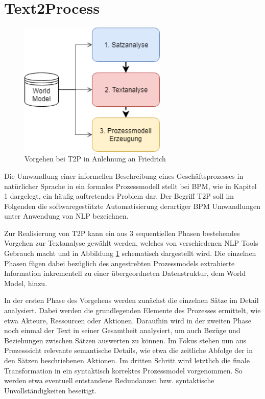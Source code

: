 \section{Text2Process}
\begin{figure}
\includegraphics[width=7cm]{pictures/T2P_highlevel.png}
\caption{Vorgehen bei T2P in Anlehnung an Friedrich}
\label{fig:T2PHL}
\end{figure}
Die Umwandlung einer informellen Beschreibung eines Geschäftsprozesses in natürlicher Sprache in ein formales Prozessmodell stellt bei \ac{BPM}, wie in Kapitel 1 dargelegt, ein häufig auftretendes Problem dar. 
Der Begriff \ac{T2P} soll im Folgenden die softwaregestützte Automatisierung derartiger \ac{BPM} Umwandlungen unter Anwendung von \ac{NLP} bezeichnen.\par
Zur Realisierung von \ac{T2P} kann ein aus 3 sequentiellen Phasen bestehendes Vorgehen zur Textanalyse gewählt werden, welches von verschiedenen \ac{NLP} Tools Gebrauch macht und in Abbildung \ref{fig:T2PHL} schematisch dargestellt wird. Die einzelnen Phasen fügen dabei bezüglich des angestrebten Prozessmodels extrahierte Information inkrementell zu einer übergeordneten Datenstruktur, dem World Model, hinzu.\par
In der ersten Phase des Vorgehens werden zunächst die einzelnen Sätze im Detail analysiert. Dabei werden die grundlegenden Elemente des Prozesses ermittelt, wie etwa Akteure, Ressourcen oder Aktionen. Daraufhin wird in der zweiten Phase noch einmal der Text in seiner Gesamtheit analysiert, um auch Bezüge und Beziehungen zwischen Sätzen auswerten zu können. Im Fokus stehen nun aus Prozesssicht relevante semantische Details, wie etwa die zeitliche Abfolge der in den Sätzen beschriebenen Aktionen. Im dritten Schritt wird letztlich die finale Transformation in ein syntaktisch korrektes Prozessmodel vorgenommen. So werden etwa  eventuell entstandene Redundanzen bzw. syntaktische Unvollständigkeiten beseitigt. 


